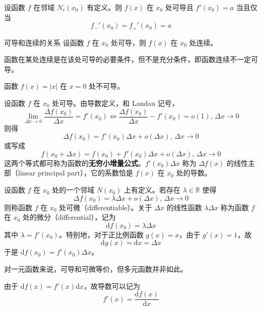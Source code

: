 \begin{proposition}
    设函数 $f$ 在邻域 $N_r(x_0)$ 有定义。则 $f(x)$ 在 $x_0$ 处可导且 $f'(x_0) = a$ 当且仅当
    \[f_{-}'(x_0) = f_{+}'(x_0) = a\]
\end{proposition}

\begin{theorem}{可导和连续的关系}
    设函数 $f$ 在 $x_0$ 处可导，则 $f(x)$ 在 $x_0$ 处连续。
\end{theorem}
\begin{remark}
    函数在某处连续是在该处可导的必要条件，但不是充分条件，即函数连续不一定可导。
\end{remark}

\hfill

\begin{example}
    函数 $f(x) = |x|$ 在 $x = 0$ 处不可导。
\end{example}

\hfill

设函数 $f$ 在 $x_0$ 处可导。由导数定义，和 Landau 记号，
\[\lim_{\Delta x\to 0}\frac{\Delta f(x_0)}{\Delta x} = f'(x_0) \iff \frac{\Delta f(x_0)}{\Delta x} - f'(x_0) = o(1),\, \Delta x\to 0\]
则得
\begin{equation}
    \Delta f(x_0) = f'(x_0)\Delta x + o(\Delta x),\, \Delta x\to 0
\end{equation}
或写成
\begin{equation}
    f(x_0 + \Delta x) = f(x_0) + f'(x_0)\Delta x + o(\Delta x),\, \Delta x\to 0
\end{equation}
这两个等式都可称为函数的\textbf{无穷小增量公式}。$f'(x_0)\Delta x$ 称为 $\Delta f(x)$ 的线性主部（linear principal part），它的系数恰是 $f(x)$ 在 $x_0$ 处的导数。

\begin{definition}
    设函数 $f$ 在 $x_0$ 处的一个邻域 $N(x_0)$ 上有定义。若存在 $\lambda\in \mathbb{R}$ 使得
    \[\Delta f(x_0) = \lambda\Delta x + o(\Delta x),\, \Delta x\to 0\]
    则称函数 $f$ 在 $x_0$ 处可微（differentiable）。关于 $\Delta x$ 的线性函数 $\lambda\Delta x$ 称为函数 $f$ 在 $x_0$ 处的微分（differential），记为
    \[\mathrm{d}f(x_0) = \lambda\Delta x\]
    其中 $\lambda = f'(x_0)$。特别地，对于正比例函数 $g(x) = x$，由于 $g'(x) = 1$，故
    \[\mathrm{d}g(x) = \mathrm{d}x = \Delta x\]
    于是 $\mathrm{d}f(x_0) = f'(x_0)\Delta x$。
\end{definition}

对一元函数来说，可导和可微等价，但多元函数并非如此。

由于 $\mathrm{d}f(x) = f'(x)\mathrm{d}x$，故导数可以记为
\begin{equation}
    f'(x) = \frac{\mathrm{d}f(x)}{\mathrm{d}x}
\end{equation}

